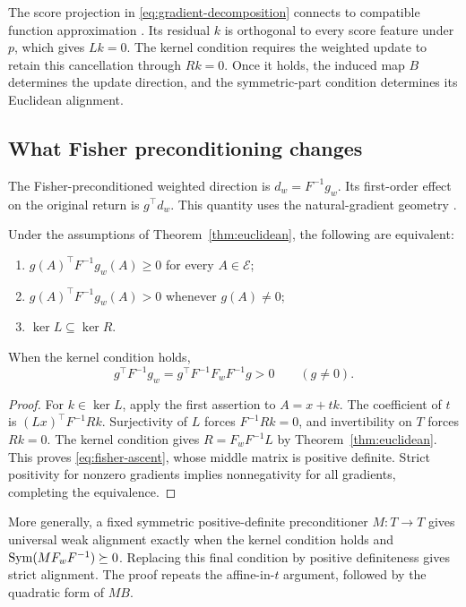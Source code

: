The score projection in \eqref{eq:gradient-decomposition} connects to compatible function approximation \cite{sutton}. Its residual $k$ is orthogonal to every score feature under $p$, which gives $Lk=0$. The kernel condition requires the weighted update to retain this cancellation through $Rk=0$. Once it holds, the induced map $B$ determines the update direction, and the symmetric-part condition determines its Euclidean alignment.

\subsection{What Fisher preconditioning changes}

The Fisher-preconditioned weighted direction is $d_w=F^{-1}g_w$. Its first-order effect on the original return is $g^\top d_w$. This quantity uses the natural-gradient geometry \cite{kakade}.

\begin{theorem}
\label{thm:fisher}
Under the assumptions of Theorem~\ref{thm:euclidean}, the following are equivalent:
\begin{enumerate}
\item $g(A)^\top F^{-1}g_w(A)\ge0$ for every $A\in\mathcal E$;
\item $g(A)^\top F^{-1}g_w(A)>0$ whenever $g(A)\ne0$;
\item $\ker L\subseteq\ker R$.
\end{enumerate}
When the kernel condition holds,
\begin{equation}
g^\top F^{-1}g_w=g^\top F^{-1}F_wF^{-1}g>0\qquad(g\ne0).
\label{eq:fisher-ascent}
\end{equation}
\end{theorem}

\begin{proof}
For $k\in\ker L$, apply the first assertion to $A=x+tk$. The coefficient of $t$ is $(Lx)^\top F^{-1}Rk$. Surjectivity of $L$ forces $F^{-1}Rk=0$, and invertibility on $T$ forces $Rk=0$. The kernel condition gives $R=F_wF^{-1}L$ by Theorem~\ref{thm:euclidean}. This proves \eqref{eq:fisher-ascent}, whose middle matrix is positive definite. Strict positivity for nonzero gradients implies nonnegativity for all gradients, completing the equivalence.
\end{proof}

More generally, a fixed symmetric positive-definite preconditioner $M:T\to T$ gives universal weak alignment exactly when the kernel condition holds and $\operatorname{Sym}(MF_wF^{-1})\succeq0$. Replacing this final condition by positive definiteness gives strict alignment. The proof repeats the affine-in-$t$ argument, followed by the quadratic form of $MB$.


